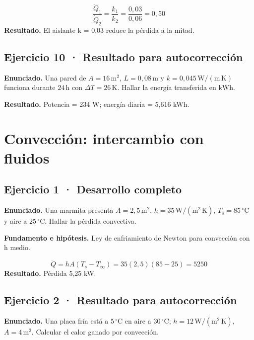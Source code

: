 \documentclass[11pt,a4paper]{article}
\begin{document}
\[
\frac{\dot Q_1}{\dot Q_2}=\frac{k_1}{k_2}=\frac{0{,}03}{0{,}06}=0{,}50
\]
\textbf{Resultado.} El aislante k = 0,03 reduce la pérdida a la mitad.


\subsection*{Ejercicio 10 · Resultado para autocorrección}
\textbf{Enunciado.} Una pared de \(A=16\,\mathrm m^2\), \(L=0{,}08\,\mathrm m\) y \(k=0{,}045\,\mathrm{W/(m\,K)}\) funciona durante \(24\,\mathrm h\) con \(\Delta T=26\,\mathrm K\). Hallar la energía transferida en \(\mathrm{kWh}\).

\textbf{Resultado.} Potencia = 234 W; energía diaria = 5,616 kWh.


\clearpage

\section{Convección: intercambio con fluidos}

\begin{center}\end{center}

\subsection*{Ejercicio 1 · Desarrollo completo}
\textbf{Enunciado.} Una marmita presenta \(A=2{,}5\,\mathrm m^2\), \(h=35\,\mathrm{W/(m^2\,K)}\), \(T_s=85\,^\circ\mathrm C\) y aire a \(25\,^\circ\mathrm C\). Hallar la pérdida convectiva.

\textbf{Fundamento e hipótesis.} Ley de enfriamiento de Newton para convección con h medio.

\[
\dot Q=hA(T_s-T_\infty)=35(2{,}5)(85-25)=5250
\]
\textbf{Resultado.} Pérdida 5,25 kW.


\subsection*{Ejercicio 2 · Resultado para autocorrección}
\textbf{Enunciado.} Una placa fría está a \(5\,^\circ\mathrm C\) en aire a \(30\,^\circ\mathrm C\); \(h=12\,\mathrm{W/(m^2\,K)}\), \(A=4\,\mathrm m^2\). Calcular el calor ganado por convección.
\end{document}

